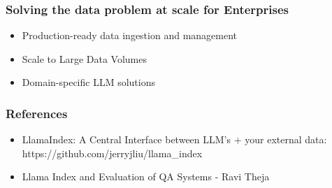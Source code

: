 \begin{frame}[fragile]\frametitle{Solving the data problem at scale for Enterprises}


\begin{itemize}
\item Production-ready data ingestion and management
\item Scale to Large Data Volumes
\item Domain-specific LLM solutions
\end{itemize}	

\end{frame}

\begin{frame}[fragile]\frametitle{References}


\begin{itemize}
\item LlamaIndex: A Central Interface between LLM’s + your external data: https://github.com/jerryjliu/llama\_index
\item Llama Index and Evaluation of QA Systems - Ravi Theja

\end{itemize}


\end{frame}